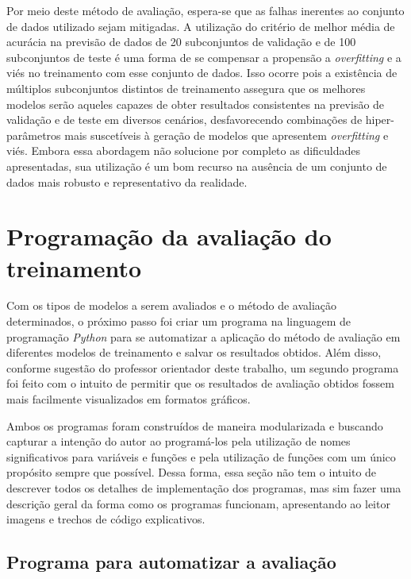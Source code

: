 Por meio deste método de avaliação, espera-se que as falhas inerentes ao conjunto de dados utilizado sejam mitigadas. A utilização do critério de melhor média de acurácia na previsão de dados de 20 subconjuntos de validação e de 100 subconjuntos de teste é uma forma de se compensar a propensão a \textit{overfitting} e a viés no treinamento com esse conjunto de dados. Isso ocorre pois a existência de múltiplos subconjuntos distintos de treinamento assegura que os melhores modelos serão aqueles capazes de obter resultados consistentes na previsão de validação e de teste em diversos cenários, desfavorecendo combinações de hiper-parâmetros mais suscetíveis à geração de modelos que apresentem \textit{overfitting} e viés. Embora essa abordagem não solucione por completo as dificuldades apresentadas, sua utilização é um bom recurso na ausência de um conjunto de dados mais robusto e representativo da realidade.

\section{Programação da avaliação do treinamento}

Com os tipos de modelos a serem avaliados e o método de avaliação determinados, o próximo passo foi criar um programa na linguagem de programação \textit{Python} para se automatizar a aplicação do método de avaliação em diferentes modelos de treinamento e salvar os resultados obtidos. Além disso, conforme sugestão do professor orientador deste trabalho, um segundo programa foi feito com o intuito de permitir que os resultados de avaliação obtidos fossem mais facilmente visualizados em formatos gráficos.

Ambos os programas foram construídos de maneira modularizada e buscando capturar a intenção do autor ao programá-los pela utilização de nomes significativos para variáveis e funções e pela utilização de funções com um único propósito sempre que possível. Dessa forma, essa seção não tem o intuito de descrever todos os detalhes de implementação dos programas, mas sim fazer uma descrição geral da forma como os programas funcionam, apresentando ao leitor imagens e trechos de código explicativos.

\subsection{Programa para automatizar a avaliação}

